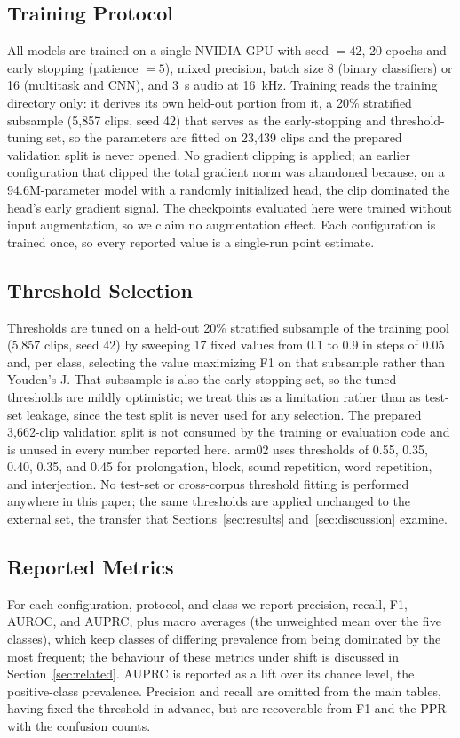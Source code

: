 \documentclass[a4paper,orivec]{llncs}
\begin{document}
\subsection{Training Protocol}
All models are trained on a single NVIDIA GPU with seed $= 42$, 20 epochs and
early stopping (patience $= 5$), mixed precision, batch size 8 (binary
classifiers) or 16 (multitask and CNN), and 3~s audio at 16~kHz. Training reads
the training directory only: it derives its own held-out portion from it, a 20\%
stratified subsample (5{,}857 clips, seed 42) that serves as the early-stopping
and threshold-tuning set, so the parameters are fitted on 23{,}439 clips and the
prepared validation split is never opened. No gradient
clipping is applied; an earlier configuration that clipped the total gradient norm
was abandoned because, on a 94.6M-parameter model with a randomly initialized
head, the clip dominated the head's early gradient signal. The checkpoints
evaluated here were trained without input augmentation, so
we claim no augmentation effect. Each configuration is trained once, so every
reported value is a single-run point estimate.

\subsection{Threshold Selection}
Thresholds are tuned on a held-out 20\% stratified subsample of the training pool
(5{,}857 clips, seed 42) by sweeping 17 fixed values from
0.1 to 0.9 in steps of 0.05 and, per class, selecting the value maximizing
F1 on that subsample rather than Youden's J. That subsample is also the
early-stopping set, so the tuned thresholds are mildly optimistic; we treat this as
a limitation rather than as test-set leakage, since the test split is never used
for any selection. The prepared 3{,}662-clip validation split is not consumed by
the training or evaluation code and is unused in every number reported here.
arm02 uses thresholds of 0.55, 0.35, 0.40, 0.35, and 0.45 for prolongation, block,
sound repetition, word repetition, and interjection. No test-set or
cross-corpus threshold fitting is performed anywhere in this paper; the same thresholds are applied unchanged to the
external set, the transfer that Sections~\ref{sec:results}
and~\ref{sec:discussion} examine.

\subsection{Reported Metrics}
\label{sec:metrics}
For each configuration, protocol, and class we report precision, recall, F1,
AUROC, and AUPRC, plus macro averages (the unweighted mean over the five classes),
which keep classes of differing prevalence from being dominated by the most
frequent; the behaviour of these metrics under shift is discussed in
Section~\ref{sec:related}. AUPRC is reported as a lift over its chance level, the
positive-class prevalence. Precision and recall are omitted from the main tables,
having fixed the threshold in advance, but are recoverable from F1 and the PPR
with the confusion counts.
\end{document}
